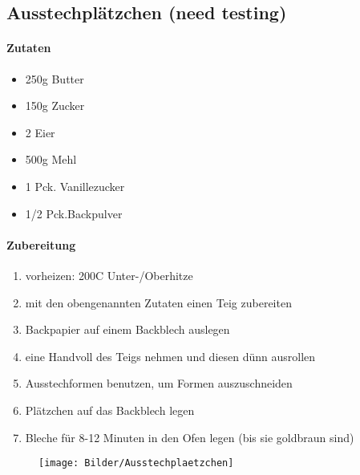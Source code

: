 \newpage
\subsection{Ausstechplätzchen (need testing)}
\paragraph{Zutaten}
\begin{itemize}[noitemsep]
	\item 250g Butter
	\item 150g Zucker
	\item 2 Eier
	\item 500g Mehl
	\item 1 Pck. Vanillezucker
	\item 1/2 Pck.Backpulver
\end{itemize}
\paragraph{Zubereitung}
\begin{enumerate}[noitemsep]
	\item vorheizen: 200\textdegree C Unter-/Oberhitze
	\item mit den obengenannten Zutaten einen Teig zubereiten
	\item Backpapier auf einem Backblech auslegen
	\item eine Handvoll des Teigs nehmen und diesen dünn ausrollen
	\item Ausstechformen benutzen, um Formen auszuschneiden
	\item Plätzchen auf das Backblech legen
	\item Bleche für 8-12 Minuten in den Ofen legen (bis sie goldbraun sind)
\end{enumerate}
\vspace{0.5cm}
\begin{figure}[h]
\centering
\texttt{[image: Bilder/Ausstechplaetzchen]}
\end{figure}